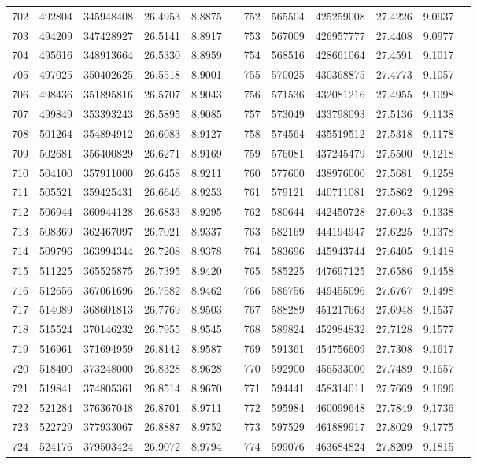 \begin{longtable}{SSSSSSSSSSSS}
702&492804&345948408&26.4953&8.8875&&752&565504&425259008&27.4226&9.0937\\
703&494209&347428927&26.5141&8.8917&&753&567009&426957777&27.4408&9.0977\\
704&495616&348913664&26.5330&8.8959&&754&568516&428661064&27.4591&9.1017\\
705&497025&350402625&26.5518&8.9001&&755&570025&430368875&27.4773&9.1057\\
706&498436&351895816&26.5707&8.9043&&756&571536&432081216&27.4955&9.1098\\
707&499849&353393243&26.5895&8.9085&&757&573049&433798093&27.5136&9.1138\\
708&501264&354894912&26.6083&8.9127&&758&574564&435519512&27.5318&9.1178\\
709&502681&356400829&26.6271&8.9169&&759&576081&437245479&27.5500&9.1218\\
710&504100&357911000&26.6458&8.9211&&760&577600&438976000&27.5681&9.1258\\
711&505521&359425431&26.6646&8.9253&&761&579121&440711081&27.5862&9.1298\\
712&506944&360944128&26.6833&8.9295&&762&580644&442450728&27.6043&9.1338\\
713&508369&362467097&26.7021&8.9337&&763&582169&444194947&27.6225&9.1378\\
714&509796&363994344&26.7208&8.9378&&764&583696&445943744&27.6405&9.1418\\
715&511225&365525875&26.7395&8.9420&&765&585225&447697125&27.6586&9.1458\\
716&512656&367061696&26.7582&8.9462&&766&586756&449455096&27.6767&9.1498\\
717&514089&368601813&26.7769&8.9503&&767&588289&451217663&27.6948&9.1537\\
718&515524&370146232&26.7955&8.9545&&768&589824&452984832&27.7128&9.1577\\
719&516961&371694959&26.8142&8.9587&&769&591361&454756609&27.7308&9.1617\\
720&518400&373248000&26.8328&8.9628&&770&592900&456533000&27.7489&9.1657\\
721&519841&374805361&26.8514&8.9670&&771&594441&458314011&27.7669&9.1696\\
722&521284&376367048&26.8701&8.9711&&772&595984&460099648&27.7849&9.1736\\
723&522729&377933067&26.8887&8.9752&&773&597529&461889917&27.8029&9.1775\\
724&524176&379503424&26.9072&8.9794&&774&599076&463684824&27.8209&9.1815\\

\end{longtable}
